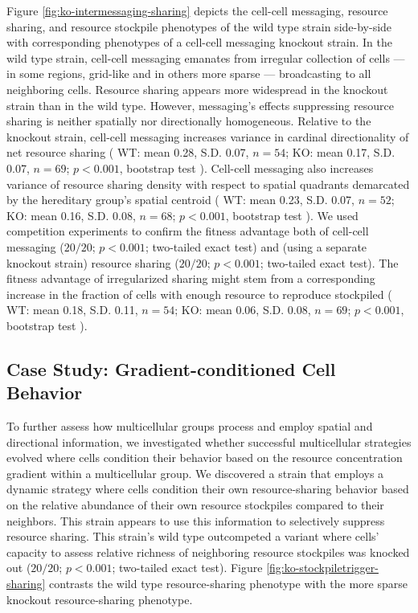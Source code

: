 Figure \ref{fig:ko-intermessaging-sharing} depicts the cell-cell messaging, resource sharing, and resource stockpile phenotypes of the wild type strain side-by-side with corresponding phenotypes of a cell-cell messaging knockout strain.
In the wild type strain, cell-cell messaging emanates from irregular collection of cells --- in some regions, grid-like and in others more sparse --- broadcasting to all neighboring cells.
Resource sharing appears more widespread in the knockout strain than in the wild type.
However, messaging's effects suppressing resource sharing is neither spatially nor directionally homogeneous.
Relative to the knockout strain, cell-cell messaging increases variance in cardinal directionality of net resource sharing
(%
WT: mean 0.28, S.D. 0.07, $n=54$; %
KO: mean 0.17, S.D. 0.07, $n=69$; %
$p < 0.001$, bootstrap test%
).
Cell-cell messaging also increases variance of resource sharing density with respect to spatial quadrants demarcated by the hereditary group's spatial centroid
(%
WT: mean 0.23, S.D. 0.07, $n=52$; %
KO: mean 0.16, S.D. 0.08, $n=68$; %
$p < 0.001$, bootstrap test%
).
We used competition experiments to confirm the fitness advantage both of cell-cell messaging ($20/20$; $p < 0.001$; two-tailed exact test) and (using a separate knockout strain) resource sharing ($20/20$; $p < 0.001$; two-tailed exact test).
The fitness advantage of irregularized sharing might stem from a corresponding increase in the fraction of cells with enough resource to reproduce stockpiled
(%
WT: mean 0.18, S.D. 0.11, $n=54$; %
KO: mean 0.06, S.D. 0.08, $n=69$; %
$p < 0.001$, bootstrap test%
).

\subsection{Case Study: Gradient-conditioned Cell Behavior} \label{sec:gradient-conditioned-behavior}



To further assess how multicellular groups process and employ spatial and directional information, we investigated whether successful multicellular strategies evolved where cells condition their behavior based on the resource concentration gradient within a multicellular group.
We discovered a strain that employs a dynamic strategy where cells condition their own resource-sharing behavior based on the relative abundance of their own resource stockpiles compared to their neighbors.
This strain appears to use this information to selectively suppress resource sharing.
This strain's wild type outcompeted a variant where cells' capacity to assess relative richness of neighboring resource stockpiles was knocked out ($20/20$; $p < 0.001$; two-tailed exact test).
Figure \ref{fig:ko-stockpiletrigger-sharing} contrasts the wild type resource-sharing phenotype with the more sparse knockout resource-sharing phenotype.

